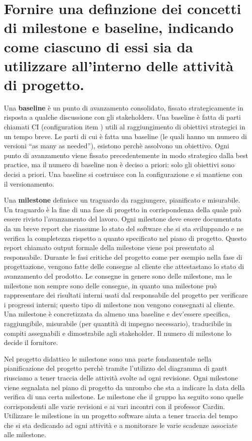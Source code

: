 \section{Fornire una definzione dei concetti di \textbf{milestone} e \textbf{baseline}, indicando come ciascuno di essi sia da utilizzare all'interno delle attività di progetto.}
Una \textbf{baseline} è un punto di avanzamento consolidato, fissato strategicamente in risposta a qualche discussione con gli stakeholders. Una baseline è fatta di parti chiamati CI (configuration item ) utili al raggiungimento di obiettivi strategici in un tempo breve. Le parti di cui è fatta una baseline (le quali hanno un numero di versioni “as many as needed”), esistono perchè assolvono un obiettivo.
Ogni punto di avanzamento viene fissato precedentemente in modo strategico dalla best practice, ma il numero di baseline non è deciso a priori:  solo gli obiettivi sono decisi a priori.
Una baseline si costruisce con la configurazione e si mantiene con il versionamento.

Una \textbf{milestone} definisce un traguardo da raggiungere, pianificato e misurabile. Un traguardo è la fine di una fase di progetto in corrispondenza della quale può essere rivisto l'avanzamento del lavoro. Ogni milestone deve essere documentata da un breve report che riassume lo stato del software che si sta sviluppando e ne verifica la completezza rispetto a quanto specificato nel piano di progetto.
Questo report chiamato output formale della milestone viene poi presentato al responsabile.
Durante le fasi critiche del progetto come per esempio nella fase di progettazione, vengono fatte delle consegne al cliente che attestastano lo stato di avanzamento del prodotto. Le consegne in genere sono delle milestone, ma le milestone non sempre sono delle consegne, in quanto una milestone può rappresentare dei risultati interni usati dal responsabile del progetto per verificare i progressi interni; questo tipo di milestone non vengono consegnati al cliente. Una milestone è concretizzata da almeno una baseline e dev'essere specifica, raggiungibile, misurabile (per quantità di impegno necessario), traducibile in compiti assegnabili e dimostrabile agli stakeholder. Il numero di milestone lo decide il fornitore.


Nel progetto didattico le milestone sono una parte fondamentale nella pianificazione del progetto perchè tramite l'utilizzo del diagramma di gantt riusciamo a tener traccia delle attività svolte ad ogni revisione. Ogni milestone viene segnalata nel piano di progetto da unrombo che sta a indicare la data della verifica di una certa milestone. Le milestone che il gruppo ha seguito sono quelle corrispondenti alle varie revisioni e ai vari incontri con il professor Cardin.
Utilizzare le milestione in un progetto software aiuta a tener traccia del tempo che si sta dedicando ad ogni attività e a monitorare le varie scadenze associate alle milestone.